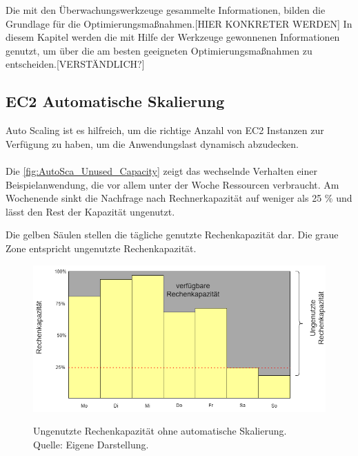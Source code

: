 
Die mit den Überwachungswerkzeuge gesammelte Informationen, bilden die Grundlage für die Optimierungsmaßnahmen.[HIER KONKRETER WERDEN]
In diesem Kapitel werden die mit Hilfe der Werkzeuge gewonnenen Informationen genutzt, um über die am besten geeigneten Optimierungsmaßnahmen zu entscheiden.[VERSTÄNDLICH?]

\subsection{EC2 Automatische Skalierung}
Auto Scaling ist es hilfreich, um die richtige Anzahl von EC2 Instanzen zur Verfügung zu haben, um die Anwendungslast dynamisch abzudecken.
\\\\

Die \autoref{fig:AutoSca_Unused_Capacity} zeigt das wechselnde Verhalten einer Beispielanwendung, die vor allem unter der Woche Ressourcen verbraucht. Am Wochenende sinkt die Nachfrage nach Rechnerkapazität auf weniger als 25 \% und lässt den Rest der Kapazität ungenutzt. 

Die gelben Säulen stellen die tägliche genutzte Rechenkapazität dar.
Die graue Zone entspricht ungenutzte Rechenkapazität. 

\begin{figure}[h]
    \centering
    \includegraphics[scale=0.5]{sources/AutoCap Unused Capacity}
    \caption[Ungenutzte Rechenkapazität ohne automatische Skalierung]{}
    \label{fig:AutoSca_Unused_Capacity} Ungenutzte Rechenkapazität ohne automatische Skalierung. \\
    Quelle: Eigene Darstellung. 
  \end{figure}

